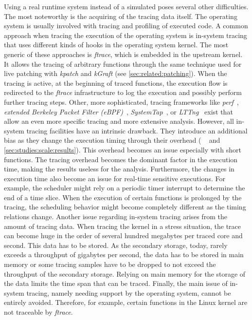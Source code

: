 Using a real runtime system instead of a simulated poses several other difficulties. The most noteworthy is the acquiring of the tracing data itself. The operating system is usually involved with tracing and profiling of executed code. A common approach when tracing the execution of the operating system is in-system tracing that uses different kinds of hooks in the operating system kernel. The most generic of these approaches is \emph{ftrace}, which is embedded in the upstream kernel. It allows the tracing of arbitrary functions through the same technique used for live patching with \emph{kpatch} and \emph{kGraft} (see \cref{sec:related:patching}). When the tracing is active, at the beginning of traced functions, the execution flow is redirected to the \emph{ftrace} infrastructure to log the execution and possibly perform further tracing steps. Other, more sophisticated, tracing frameworks like \emph{perf}~\cite{perf}, \emph{extended Berkeley Packet Filter (eBPF)}~\cite{Corbet:2014:eBPF}, \emph{SystemTap}~\cite{Eigler:2006:Systemtap,systemtap}, or \emph{LTTng}~\cite{Desnoyers:2006:LTTng,lttng} exist that allow an even more specific tracing and more extensive analysis. However, all in-system tracing facilities have an intrinsic drawback. They introduce an additional bias as they change the execution timing through their overhead (\cf{} \citeauthor{Weaver:2013:Overhead}~\cite{Weaver:2013:Overhead,Weaver:2015:Overhead} and \cref{sec:studies:scale:results}). This overhead becomes an issue especially with short functions. The tracing overhead becomes the dominant factor in the execution time, making the results useless for the analysis. Furthermore, the changes in execution time also become an issue for real-time sensitive executions. For example, the scheduler might rely on a periodic timer interrupt to determine the end of a time slice. When the execution of certain functions is prolonged by the tracing, the scheduling behavior might become completely different as the timing relations change. Another issue regarding in-system tracing arises from the amount of tracing data. When tracing the kernel in a stress situation, the trace can become huge in the order of several hundred megabytes per traced core and second. This data has to be stored. As the secondary storage, today, rarely exceeds a throughput of gigabytes per second, the data has to be stored in main memory or some tracing samples have to be dropped to not exceed the throughput of the secondary storage. Relying on main memory for the storage of the data limits the time span that can be traced. Finally, the main issue of in-system tracing, namely needing support by the operating system, cannot be entirely avoided. Therefore, for example, certain functions in the Linux kernel are not traceable by \emph{ftrace}.

